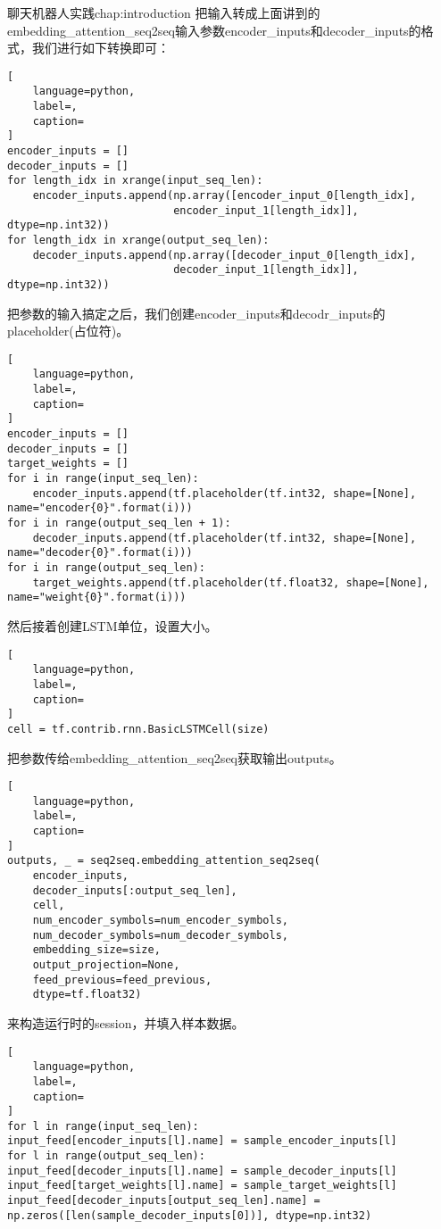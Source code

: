 \begin{cuzchapter}{聊天机器人实践}{chap:introduction}
把输入转成上面讲到的embedding\_attention\_seq2seq输入参数encoder\_inputs和decoder\_inputs的格式，我们进行如下转换即可：
\begin{lstlisting}[
    language=python,
    label=,
    caption=
]
encoder_inputs = []
decoder_inputs = []
for length_idx in xrange(input_seq_len):
    encoder_inputs.append(np.array([encoder_input_0[length_idx], 
                          encoder_input_1[length_idx]], dtype=np.int32))
for length_idx in xrange(output_seq_len):
    decoder_inputs.append(np.array([decoder_input_0[length_idx], 
                          decoder_input_1[length_idx]], dtype=np.int32))
\end{lstlisting}

把参数的输入搞定之后，我们创建encoder\_inputs和decodr\_inputs的placeholder(占位符)。
\begin{lstlisting}[
    language=python,
    label=,
    caption=
]
encoder_inputs = []
decoder_inputs = []
target_weights = []
for i in range(input_seq_len):
    encoder_inputs.append(tf.placeholder(tf.int32, shape=[None], name="encoder{0}".format(i)))
for i in range(output_seq_len + 1):
    decoder_inputs.append(tf.placeholder(tf.int32, shape=[None], name="decoder{0}".format(i)))
for i in range(output_seq_len):
    target_weights.append(tf.placeholder(tf.float32, shape=[None], name="weight{0}".format(i)))
\end{lstlisting}

然后接着创建LSTM单位，设置大小。
\begin{lstlisting}[
    language=python,
    label=,
    caption=
]
cell = tf.contrib.rnn.BasicLSTMCell(size)
\end{lstlisting}

把参数传给embedding\_attention\_seq2seq获取输出outputs。
\begin{lstlisting}[
    language=python,
    label=,
    caption=
]
outputs, _ = seq2seq.embedding_attention_seq2seq(
    encoder_inputs,
    decoder_inputs[:output_seq_len],
    cell,
    num_encoder_symbols=num_encoder_symbols,
    num_decoder_symbols=num_decoder_symbols,
    embedding_size=size,
    output_projection=None,
    feed_previous=feed_previous,
    dtype=tf.float32)
\end{lstlisting}

来构造运行时的session，并填入样本数据。
\begin{lstlisting}[
    language=python,
    label=,
    caption=
]
for l in range(input_seq_len):
input_feed[encoder_inputs[l].name] = sample_encoder_inputs[l]
for l in range(output_seq_len):
input_feed[decoder_inputs[l].name] = sample_decoder_inputs[l]
input_feed[target_weights[l].name] = sample_target_weights[l]
input_feed[decoder_inputs[output_seq_len].name] = np.zeros([len(sample_decoder_inputs[0])], dtype=np.int32)
\end{lstlisting}


\end{cuzchapter}
